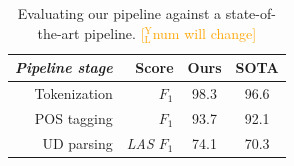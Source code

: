 \documentclass[11pt,a4paper]{article}
\newcommand{\yjcomment}[1]{\textcolor{orange}{[$_\mathrm{L}^\mathrm{Y}$#1]}}
\newcommand{\nascomment}[1]{\textcolor{blue}{[#1 ---\textsc{nas}]}}
\newcommand{\yicomment}[1]{\textcolor{gray}{[#1 ---\textsc{yi}]}}
\begin{document}
%




\begin{table}[t]
	\centering
	\begin{tabular}{rrcc}
		\hline
		\it Pipeline stage & Score & Ours & SOTA \\
		\hline
		Tokenization  & \it $F_1$ & 98.3 & 96.6 \\		
		POS tagging &  \it  $F_1$ & 93.7 & 92.1 \\
		UD parsing & \it LAS $F_1$ & 74.1 & 70.3 \\
		\hline
	\end{tabular}
	\caption{Evaluating our pipeline against a state-of-the-art pipeline. \yjcomment{num will change}\label{tbl:pipline} %
	}
\end{table}
\end{document}
